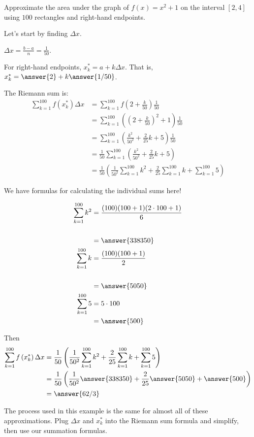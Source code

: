 \documentclass{ximera}
\begin{document}
  
\begin{example}
	Approximate the area under the graph of $f(x) = x^2+1$ on the interval $[2,4]$ using $100$ rectangles and right-hand endpoints.
	\begin{explanation}
		Let's start by finding $\Delta x$.  
		
		$\Delta x = \frac{b-a}{n} = \frac{1}{50}$.


		For right-hand endpoints, $x_k^* = a + k \Delta x$.  
		That is, $x_k^* = \answer{2} + k \answer{1/50}$.
		
		The Riemann sum is:
		\begin{align*}
			\sum_{k=1}^{100} f\left( x_k^* \right) \Delta x
				&=\sum_{k=1}^{100} f\left( 2 + \frac{k}{50} \right) \frac{1}{50}\\
				&=\sum_{k=1}^{100}\left( \left( 2 + \frac{k}{50} \right)^2+1 \right)\frac{1}{50}\\
				&= \sum_{k=1}^{100} \left( \frac{k^2}{50^2} + \frac{2}{25}k+5\right) \frac{1}{50}\\
				&= \frac{1}{50}\sum_{k=1}^{100} \left( \frac{k^2}{50^2} + \frac{2}{25}k+5\right)\\
				&= \frac{1}{50}\left(\frac{1}{50^2}\sum_{k=1}^{100} k^2 + \frac{2}{25}\sum_{k=1}^{100}k+ \sum_{k=1}^{100}5\right)
		\end{align*}

		We have formulas for calculating the individual sums here!
		
		\begin{align*} 
			\sum_{k=1}^{100} k^2 &= \frac{(100)(100+1)(2\cdot100+1)}{6} \\ \\
				&= \answer{338350}\\
			\sum_{k=1}^{100} k &= \frac{(100)(100+1)}{2} \\ \\
				&= \answer{5050}\\
			\sum_{k=1}^{100} 5 &= 5 \cdot 100 \\
				&= \answer{500}
		\end{align*}
		
		Then
		\begin{align*}
			\sum_{k=1}^{100} f\left( x_k^* \right) \Delta x
				&=\frac{1}{50}\left(\frac{1}{50^2}\sum_{k=1}^{100} k^2 + \frac{2}{25}\sum_{k=1}^{100}k+ \sum_{k=1}^{100}5\right) \\
				&= \frac{1}{50}\left(\frac{1}{50^2}\answer{338350} + \frac{2}{25}\answer{5050}+ \answer{500}\right) \\
				&= \answer{62/3}
		\end{align*}
	\end{explanation}
\end{example}
 
The process used in this example is the same for almost all of these approximations.  Plug $\Delta x$ and $x_k^*$ into the Riemann sum formula and simplify,
then use our summation formulas.
  
 
 
\end{document}
